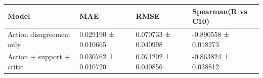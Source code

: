 \begin{tabular}{llll}
\toprule
Model & MAE & RMSE & Spearman(R vs C10) \\
\midrule
Action disagreement only & 0.029190 ± 0.010665 & 0.070733 ± 0.040998 & -0.890558 ± 0.018273 \\
Action + support + critic & 0.030762 ± 0.010720 & 0.071202 ± 0.040856 & -0.863824 ± 0.038812 \\
\bottomrule
\end{tabular}
